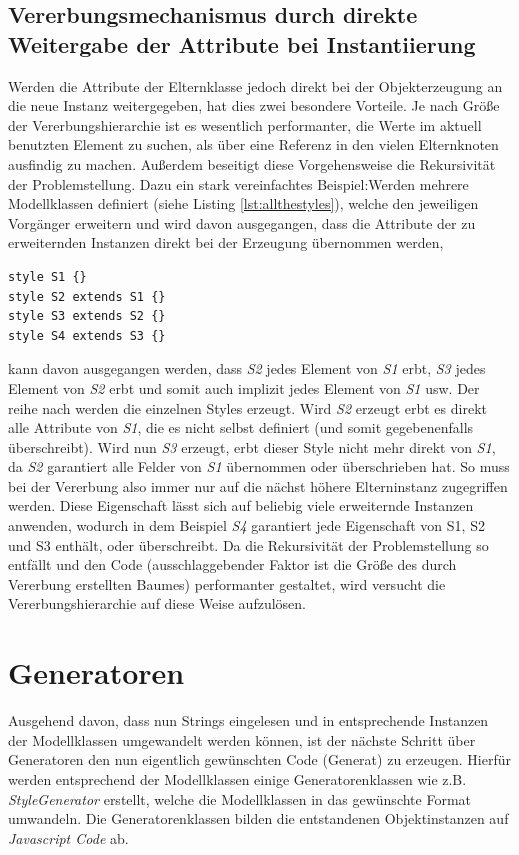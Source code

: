 \subsection{Vererbungsmechanismus durch direkte Weitergabe der Attribute bei Instantiierung}
Werden die Attribute der Elternklasse jedoch direkt bei der Objekterzeugung an die neue Instanz weitergegeben, hat dies zwei besondere Vorteile. Je nach Größe der Vererbungshierarchie ist es wesentlich performanter, die Werte im aktuell benutzten Element zu suchen, als über eine Referenz in den vielen Elternknoten ausfindig zu machen. Außerdem beseitigt diese Vorgehensweise die Rekursivität der Problemstellung. Dazu ein stark vereinfachtes Beispiel:\linebreak Werden mehrere Modellklassen definiert (siehe Listing \ref{lst:allthestyles}), welche den jeweiligen Vorgänger erweitern und wird davon ausgegangen, dass die Attribute der zu erweiternden Instanzen direkt bei der Erzeugung übernommen werden,
\begin{lstlisting}[style=spray, caption = {Definition einiger Styles, die vom jeweils nächsten Style erweitert werden}, label = {lst:allthestyles}]
style S1 {}
style S2 extends S1 {}
style S3 extends S2 {}
style S4 extends S3 {}
\end{lstlisting}kann davon ausgegangen werden, dass \textit{S2} jedes Element von \textit{S1} erbt, \textit{S3} jedes Element von \textit{S2} erbt und somit auch implizit jedes Element von \textit{S1} usw. Der reihe nach werden die einzelnen Styles erzeugt. Wird \textit{S2} erzeugt erbt es direkt alle Attribute von \textit{S1}, die es nicht selbst definiert (und somit gegebenenfalls überschreibt). Wird nun \textit{S3} erzeugt, erbt dieser Style nicht mehr direkt von \textit{S1}, da \textit{S2} garantiert alle Felder von \textit{S1} übernommen oder überschrieben hat. So muss bei der Vererbung also immer nur auf die nächst höhere Elterninstanz zugegriffen werden. Diese Eigenschaft lässt sich auf beliebig viele erweiternde Instanzen anwenden, wodurch in dem Beispiel \textit{S4} garantiert jede Eigenschaft von S1, S2 und S3 enthält, oder überschreibt. Da die Rekursivität der Problemstellung so entfällt und den Code (ausschlaggebender Faktor ist die Größe des durch Vererbung erstellten Baumes) performanter gestaltet, wird versucht die Vererbungshierarchie auf diese Weise aufzulösen.

\section{Generatoren}Ausgehend davon, dass nun Strings eingelesen und in entsprechende Instanzen der Modellklassen umgewandelt werden können, ist der nächste Schritt über Generatoren den nun eigentlich gewünschten Code (Generat) zu erzeugen. Hierfür werden entsprechend der Modellklassen einige Generatorenklassen wie z.B. \textit{StyleGenerator} erstellt, welche die Modellklassen in das gewünschte Format umwandeln. Die Generatorenklassen bilden die entstandenen Objektinstanzen auf \textit{Javascript Code} ab.